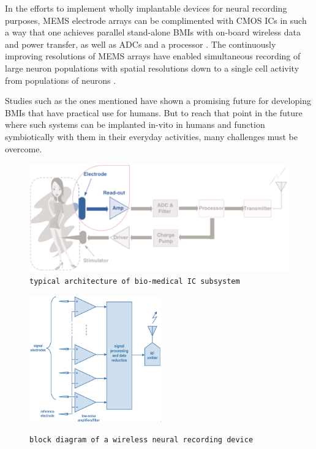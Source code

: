     In the efforts to implement wholly implantable devices for neural recording purposes, \acf{MEMS} electrode arrays can be complimented with \acf{CMOS} \acl{IC}s in such a way that one achieves parallel stand-alone \acs{BMI}s with on-board wireless data and power transfer, as well as \acs{ADC}s and a processor \cite{najafi1986implantable,wise2004wireless,olsson2005three}. The continuously improving resolutions of \acs{MEMS} arrays have enabled simultaneous recording of large neuron populations with spatial resolutions down to a single cell activity from populations of neurons \cite{kipke2003silicon}.

    Studies such as the ones mentioned have shown a promising future for developing \acs{BMI}s that have practical use for humans. But to reach that point in the future where such systems can be implanted in-vito in humans and function symbiotically with them in their everyday activities, many challenges must be overcome. 
    \begin{figure}
	\centering
	\includegraphics[scale=.4]{images/block-bio-medical-subsystem.png}
	\caption{\texttt{\footnotesize{typical architecture of bio-medical \acs{IC} subsystem \cite{yoo2011biomedical-cmos}}}}
	\label{fig:block-arch-biomedical-subsystem}
    \end{figure}       
\begin{figure}
  \vspace{-20pt}
  \caption{\texttt{\footnotesize{block diagram of a wireless neural recording device}}}
  \includegraphics[width=5.7cm]{images/block-wirelss-neural-rec-dev.png}
  \vspace{-30pt} 
  \label{fig:block-neural-recording-dev}
\end{figure} 
